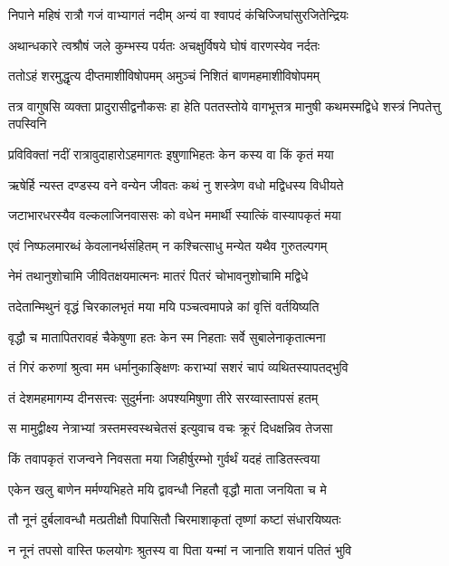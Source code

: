 \twolineshloka
{निपाने महिषं रात्रौ गजं वाभ्यागतं नदीम्}
{अन्यं वा श्वापदं कंचिज्जिघांसुरजितेन्द्रियः} %

\twolineshloka
{अथान्धकारे त्वश्रौषं जले कुम्भस्य पर्यतः}
{अचक्षुर्विषये घोषं वारणस्येव नर्दतः} %

\twolineshloka
{ततोऽहं शरमुद्धृत्य दीप्तमाशीविषोपमम्}
{अमुञ्चं निशितं बाणमहमाशीविषोपमम्} %

\threelineshloka
{तत्र वागुषसि व्यक्ता प्रादुरासीद्वनौकसः}
{हा हेति पततस्तोये वागभूत्तत्र मानुषी}
{कथमस्मद्विधे शस्त्रं निपतेत्तु तपस्विनि} %

\twolineshloka
{प्रविविक्तां नदीं रात्रावुदाहारोऽहमागतः}
{इषुणाभिहतः केन कस्य वा किं कृतं मया} %

\twolineshloka
{ऋषेर्हि न्यस्त दण्डस्य वने वन्येन जीवतः}
{कथं नु शस्त्रेण वधो मद्विधस्य विधीयते} %

\twolineshloka
{जटाभारधरस्यैव वल्कलाजिनवाससः}
{को वधेन ममार्थी स्यात्किं वास्यापकृतं मया} %

\twolineshloka
{एवं निष्फलमारब्धं केवलानर्थसंहितम्}
{न कश्चित्साधु मन्येत यथैव गुरुतल्पगम्} %

\twolineshloka
{नेमं तथानुशोचामि जीवितक्षयमात्मनः}
{मातरं पितरं चोभावनुशोचामि मद्विधे} %

\twolineshloka
{तदेतान्मिथुनं वृद्धं चिरकालभृतं मया}
{मयि पञ्चत्वमापन्ने कां वृत्तिं वर्तयिष्यति} %

\twolineshloka
{वृद्धौ च मातापितरावहं चैकेषुणा हतः}
{केन स्म निहताः सर्वे सुबालेनाकृतात्मना} %

\twolineshloka
{तं गिरं करुणां श्रुत्वा मम धर्मानुकाङ्क्षिणः}
{कराभ्यां सशरं चापं व्यथितस्यापतद्भुवि} %

\twolineshloka
{तं देशमहमागम्य दीनसत्त्वः सुदुर्मनाः}
{अपश्यमिषुणा तीरे सरय्वास्तापसं हतम्} %

\twolineshloka
{स मामुद्वीक्ष्य नेत्राभ्यां त्रस्तमस्वस्थचेतसं}
{इत्युवाच वचः क्रूरं दिधक्षन्निव तेजसा} %

\twolineshloka
{किं तवापकृतं राजन्वने निवसता मया}
{जिहीर्षुरम्भो गुर्वर्थं यदहं ताडितस्त्वया} %

\twolineshloka
{एकेन खलु बाणेन मर्मण्यभिहते मयि}
{द्वावन्धौ निहतौ वृद्धौ माता जनयिता च मे} %

\twolineshloka
{तौ नूनं दुर्बलावन्धौ मत्प्रतीक्षौ पिपासितौ}
{चिरमाशाकृतां तृष्णां कष्टां संधारयिष्यतः} %

\twolineshloka
{न नूनं तपसो वास्ति फलयोगः श्रुतस्य वा}
{पिता यन्मां न जानाति शयानं पतितं भुवि} %

